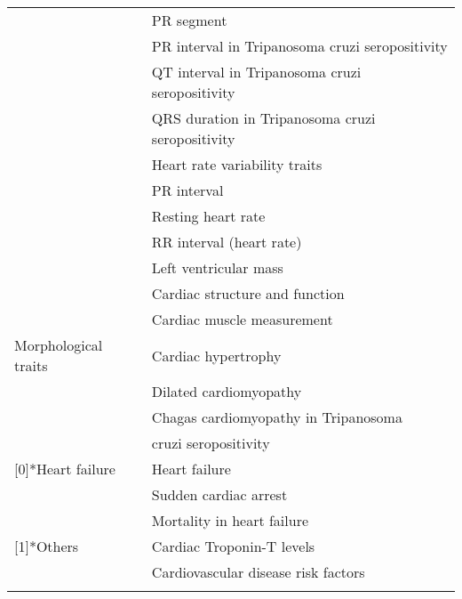 \begin{small}
\begin{longtable}{ll}
          & PR segment \\
          & PR interval in Tripanosoma cruzi seropositivity \\
          & QT interval in Tripanosoma cruzi seropositivity \\
          & QRS duration in Tripanosoma cruzi seropositivity \\
          & Heart rate variability traits \\
          & PR interval \\
          & Resting heart rate \\
          & RR interval (heart rate) \\
              \addlinespace[1.5ex]
   			& Left ventricular mass \\
          & Cardiac structure and function \\
          & Cardiac muscle measurement \\
          Morphological traits & Cardiac hypertrophy \\
          & Dilated cardiomyopathy \\
          & Chagas cardiomyopathy in Tripanosoma \\
            \addlinespace[-.5ex]
          & cruzi seropositivity \\
              \addlinespace[1.5ex]
    \multirow{3}[0]{*}{Heart failure} & Heart failure \\
          & Sudden cardiac arrest \\
          & Mortality in heart failure \\
              \addlinespace[1.5ex]
    \multirow{2}[1]{*}{Others} & Cardiac Troponin-T levels \\
          & Cardiovascular disease risk factors \\
    \bottomrule
  \label{tab:gwas-studies}%
\end{longtable}%
\end{small}

\newpage
